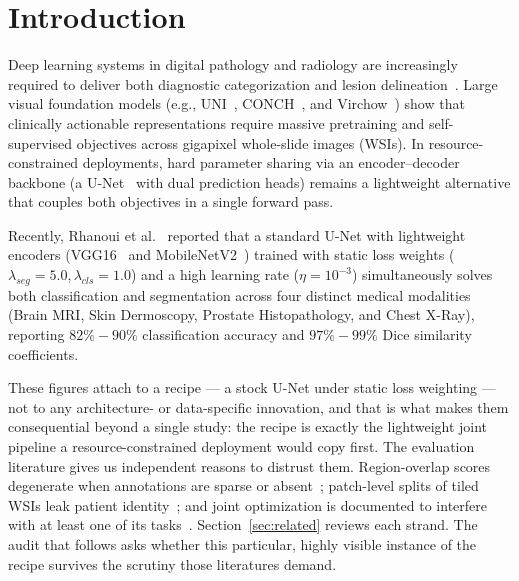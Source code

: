 \documentclass[preprint,12pt]{elsarticle}
\begin{document}
\section{Introduction}
Deep learning systems in digital pathology and radiology are increasingly required to deliver both diagnostic categorization and lesion delineation~\cite{litjens2017survey,campanella2019clinical}. Large visual foundation models (e.g., UNI~\cite{chen2024uni}, CONCH~\cite{lu2024conch}, and Virchow~\cite{vorontsov2024virchow}) show that clinically actionable representations require massive pretraining and self-supervised objectives across gigapixel whole-slide images (WSIs). In resource-constrained deployments, hard parameter sharing via an encoder--decoder backbone (a U-Net~\cite{ronneberger2015u} with dual prediction heads) remains a lightweight alternative that couples both objectives in a single forward pass.

Recently, Rhanoui et al.~\cite{rhanoui2025multitask} reported that a standard U-Net with lightweight encoders (VGG16~\cite{simonyan2014very} and MobileNetV2~\cite{sandler2018mobilenetv2}) trained with static loss weights ($\lambda_{seg}=5.0, \lambda_{cls}=1.0$) and a high learning rate ($\eta=10^{-3}$) simultaneously solves both classification and segmentation across four distinct medical modalities (Brain MRI, Skin Dermoscopy, Prostate Histopathology, and Chest X-Ray), reporting $82\%-90\%$ classification accuracy and $97\%-99\%$ Dice similarity coefficients.

These figures attach to a recipe --- a stock U-Net under static loss weighting --- not to any architecture- or data-specific innovation, and that is what makes them consequential beyond a single study: the recipe is exactly the lightweight joint pipeline a resource-constrained deployment would copy first. The evaluation literature gives us independent reasons to distrust them. Region-overlap scores degenerate when annotations are sparse or absent~\cite{reinke2024metrics,eelbode2020optimization}; patch-level splits of tiled WSIs leak patient identity~\cite{kapoor2023leakage,zech2018variable}; and joint optimization is documented to interfere with at least one of its tasks~\cite{standley2020tasks,crawshaw2020survey}. Section~\ref{sec:related} reviews each strand. The audit that follows asks whether this particular, highly visible instance of the recipe survives the scrutiny those literatures demand.
\end{document}
